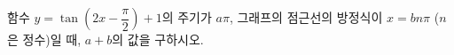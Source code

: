 함수 $y=\tan\left(2x-\dfrac{\pi}{2}\right)+1$의 주기가 $a\pi$, 그래프의 점근선의 방정식이 $x=bn\pi$ ($n$은 정수)일 때, $a+b$의 값을 구하시오. 
